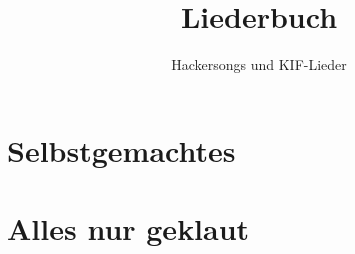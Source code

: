 \documentclass[twoside,12pt]{scrreprt}
\begin{document}
\title{Liederbuch}
\author{Hackersongs und KIF-Lieder}
\maketitle

\tableofcontents


\clearpage



\clearpage


\part{Selbstgemachtes}



\clearpage


\clearpage


\clearpage


\clearpage


\clearpage


\clearpage


\clearpage


\clearpage


\clearpage


\clearpage


\clearpage


\clearpage


\clearpage


\clearpage


\clearpage


\clearpage


\clearpage


\clearpage


\clearpage


\clearpage


\clearpage


\clearpage


\clearpage


\clearpage


\clearpage


\part{Alles nur geklaut}

\clearpage


%

\clearpage


\clearpage


\clearpage

\end{document}
